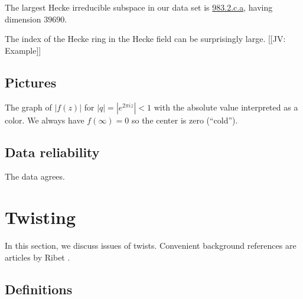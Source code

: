 \documentclass[11pt]{amsart}
\numberwithin{equation}{subsection}
\theoremstyle{plain}
\theoremstyle{definition}
\newcommand{\jv}[1]{{\color{red} \textsf{[[JV: #1]]}}}
\begin{document}
The largest Hecke irreducible subspace in our data set is \href{http://cmfs.lmfdb.xyz/ModularForm/GL2/Q/holomorphic/983/2/c/a/}{\textsf{983.2.c.a}}, having dimension $39690$.

The index of the Hecke ring in the Hecke field can be surprisingly large.  \jv{Example}

\subsection{Pictures}

The graph of $\left|f(z)\right|$ for $\left|q\right|=\left|e^{2\pi iz}\right|<1$ with the absolute value interpreted as a color.  We always have $f(\infty)=0$ so the center is zero (``cold'').  

\subsection{Data reliability}

The data agrees.

\section{Twisting} \label{sec:twists}

In this section, we discuss issues of twists.  Convenient background references are articles by Ribet \cite{Ribet:galreps,Ribet:endos}.

\subsection{Definitions}
\end{document}
